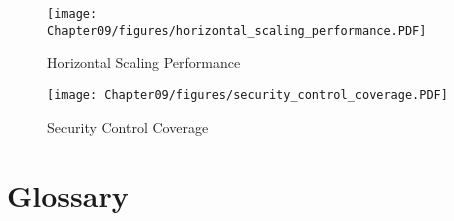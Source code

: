 
\begin{sidewaysfigure}[h]
\centering
\texttt{[image: Chapter09/figures/horizontal\_scaling\_performance.PDF]}
\caption{Horizontal Scaling Performance}
\label{fig:horizontal_scaling}
\end{sidewaysfigure}

\begin{sidewaysfigure}[h]
\centering
\texttt{[image: Chapter09/figures/security\_control\_coverage.PDF]}
\caption{Security Control Coverage}
\label{fig:security_control}
\end{sidewaysfigure}


\section{Glossary}


